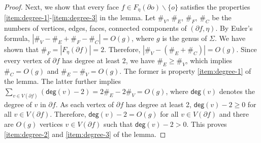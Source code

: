 \documentclass[a4paper,11pt]{article}
\numberwithin{lemma}{section}
\begin{document}
\begin{proof}
Next, we show that every face $f \in F_\eta(\partial o) \backslash \{o\}$ satisfies the properties \ref{item:degree-1}-\ref{item:degree-3} in the lemma.
Let $\#_V$, $\#_E$, $\#_F$, $\#_C$ be the numbers of vertices, edges, faces, connected components of $(\partial f,\eta)$.
By Euler's formula, $|\#_V-\#_E+\#_F-\#_C| = O(g)$, where $g$ is the genus of $\varSigma$.
We have shown that $\#_F = |F_\eta(\partial f)| = 2$.
Therefore, $|\#_V - (\#_E+\#_C)| = O(g)$.
Since every vertex of $\partial f$ has degree at least 2, we have $\#_E \geq \#_V$, which implies $\#_C = O(g)$ and $\#_E - \#_V = O(g)$.
The former is property \ref{item:degree-1} of the lemma.
The latter further implies $\sum_{v \in V(\partial f)} (\mathsf{deg}(v)-2) = 2 \#_E - 2 \#_V = O(g)$, where $\mathsf{deg}(v)$ denotes the degree of $v$ in $\partial f$.
As each vertex of $\partial f$ has degree at least 2, $\mathsf{deg}(v)-2 \geq 0$ for all $v \in V(\partial f)$.
Therefore, $\mathsf{deg}(v)-2 = O(g)$ for all $v \in V(\partial f)$ and there are $O(g)$ vertices $v \in V(\partial f)$ such that $\mathsf{deg}(v)-2 > 0$.
This proves \ref{item:degree-2} and \ref{item:degree-3} of the lemma.
\end{proof}
\end{document}
